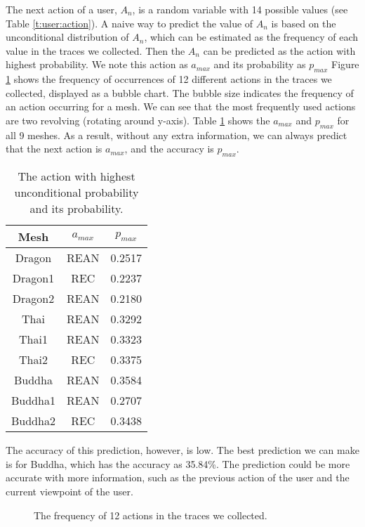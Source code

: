 The next action of a user, $A_n$, is a random variable with 14 possible values
(see Table \ref{t:user:action}). 
A naive way to predict the value of $A_n$ is based on the unconditional distribution 
of $A_n$, which can be estimated as the frequency of each value in the traces
we collected.  
Then the $A_n$ can be predicted as the action with highest probability.
We note this action as $a_{max}$ and its probability as $p_{max}$
Figure \ref{f:user:frequency}
shows the frequency of occurrences of 12 different actions in the traces we collected,
displayed as a bubble chart. 
The bubble size indicates the frequency of an action occurring for a mesh.
We can see that the most frequently used actions are two revolving (rotating around y-axis). 
Table \ref{t:user:highest_probability} shows the $a_{max}$ and $p_{max}$ for all 9 meshes.
As a result, without any extra information, we can always predict that the next action is 
$a_{max}$, and the accuracy is $p_{max}$.
\begin{table}
    \centering
    \begin{tabular}{|c|c|c|}
        \hline
        Mesh              &     $a_{max}$         &    $p_{max}$ \\
        \hline
        Dragon            &     REAN              &    0.2517    \\
        Dragon1           &     REC               &    0.2237    \\
        Dragon2           &     REAN              &    0.2180    \\
        Thai              &     REAN              &    0.3292    \\
        Thai1             &     REAN              &    0.3323    \\
        Thai2             &     REC               &    0.3375    \\
        Buddha            &     REAN              &    0.3584    \\
        Buddha1           &     REAN              &    0.2707    \\
        Buddha2           &     REC               &    0.3438    \\
        \hline
    \end{tabular}
    \caption{The action with highest unconditional probability and its probability.}
    \label{t:user:highest_probability}
\end{table}
The accuracy of this prediction, however, is low. 
The best prediction we can make is for Buddha, which has the accuracy as 35.84\%. %
The prediction could be more accurate with more information,
such as the previous action of the user and the current viewpoint of the user.
\begin{figure}[htdp!]
    \centering
    \caption{The frequency of 12 actions in the traces we collected.}
    \label{f:user:frequency}
\end{figure}

